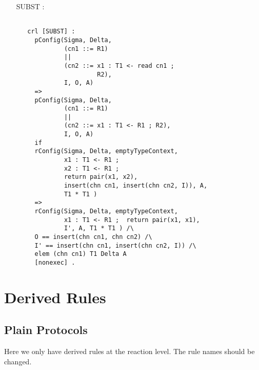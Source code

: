 \documentclass{article}
\begin{document}
\begin{itemize}
\begin{lstlisting}
      
     \end{lstlisting} 
\item[SUBST]:
\begin{lstlisting}  
  
   crl [SUBST] : 
     pConfig(Sigma, Delta,
             (cn1 ::= R1) 
             || 
             (cn2 ::= x1 : T1 <- read cn1 ; 
                      R2),
             I, O, A)  
     => 
     pConfig(Sigma, Delta,
             (cn1 ::= R1) 
             || 
             (cn2 ::= x1 : T1 <- R1 ; R2),
             I, O, A) 
     if
     rConfig(Sigma, Delta, emptyTypeContext,
             x1 : T1 <- R1 ; 
             x2 : T1 <- R1 ; 
             return pair(x1, x2),
             insert(chn cn1, insert(chn cn2, I)), A, 
             T1 * T1 )
     => 
     rConfig(Sigma, Delta, emptyTypeContext,
             x1 : T1 <- R1 ;  return pair(x1, x1),
             I', A, T1 * T1 ) /\      
     O == insert(chn cn1, chn cn2) /\ 
     I' == insert(chn cn1, insert(chn cn2, I)) /\
     elem (chn cn1) T1 Delta A
     [nonexec] .
   \end{lstlisting}
\end{itemize}

\section{Derived Rules}

\subsection{Plain Protocols}

Here we only have derived rules at the reaction level.
The rule names should be changed.
\end{document}
